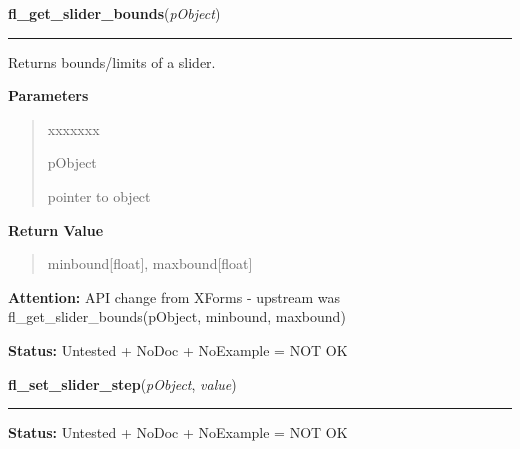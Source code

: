 \hspace{.8\funcindent}\begin{boxedminipage}{\funcwidth}

    \raggedright \textbf{fl\_get\_slider\_bounds}(\textit{pObject})

    \vspace{-1.5ex}

    \rule{\textwidth}{0.5\fboxrule}
\setlength{\parskip}{2ex}
    Returns bounds/limits of a slider.

\setlength{\parskip}{1ex}
      \textbf{Parameters}
      \vspace{-1ex}

      \begin{quote}
        \begin{Ventry}{xxxxxxx}

          \item[pObject]

          pointer to object

        \end{Ventry}

      \end{quote}

      \textbf{Return Value}
    \vspace{-1ex}

      \begin{quote}
      minbound[float], maxbound[float]

      \end{quote}

\textbf{Attention:} API change from XForms - upstream was fl\_get\_slider\_bounds(pObject, 
minbound, maxbound)



\textbf{Status:} Untested + NoDoc + NoExample = NOT OK



    \end{boxedminipage}

    \label{xformslib:library:fl_set_slider_step}

    \vspace{0.5ex}

\hspace{.8\funcindent}\begin{boxedminipage}{\funcwidth}

    \raggedright \textbf{fl\_set\_slider\_step}(\textit{pObject}, \textit{value})

    \vspace{-1.5ex}

    \rule{\textwidth}{0.5\fboxrule}
\setlength{\parskip}{2ex}
\setlength{\parskip}{1ex}
\textbf{Status:} Untested + NoDoc + NoExample = NOT OK



    \end{boxedminipage}

